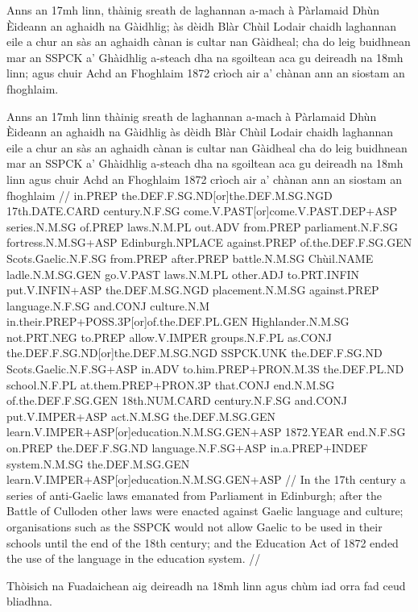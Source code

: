 \documentclass[a4paper,10pt]{article}
\begin{document}
\ex
\begingl
\glpre Anns an 17mh linn, thàinig sreath de laghannan a-mach à Pàrlamaid Dhùn Èideann an aghaidh na Gàidhlig; às dèidh Blàr Chùil Lodair chaidh laghannan eile a chur an sàs an aghaidh cànan is cultar nan Gàidheal; cha do leig buidhnean mar an SSPCK a' Ghàidhlig a-steach dha na sgoiltean aca gu deireadh na 18mh linn; agus chuir Achd an Fhoghlaim 1872 crìoch air a' chànan ann an siostam an fhoghlaim. 

\vspace{4mm}
\gla Anns an 17mh linn thàinig sreath de laghannan a-mach à Pàrlamaid Dhùn Èideann {an aghaidh} na Gàidhlig às dèidh Blàr Chùil Lodair chaidh laghannan eile a chur an sàs {an aghaidh} cànan is cultar nan Gàidheal cha do leig buidhnean mar an SSPCK a' Ghàidhlig a-steach dha na sgoiltean aca gu deireadh na 18mh linn agus chuir Achd an Fhoghlaim 1872 crìoch air a' chànan {ann an} siostam an fhoghlaim  //
\glb in.PREP the.DEF.F.SG.ND[or]the.DEF.M.SG.NGD 17th.DATE.CARD century.N.F.SG come.V.PAST[or]come.V.PAST.DEP+ASP series.N.M.SG of.PREP laws.N.M.PL out.ADV from.PREP parliament.N.F.SG fortress.N.M.SG+ASP Edinburgh.NPLACE against.PREP of.the.DEF.F.SG.GEN Scots.Gaelic.N.F.SG from.PREP after.PREP battle.N.M.SG Chùil.NAME ladle.N.M.SG.GEN go.V.PAST laws.N.M.PL other.ADJ to.PRT.INFIN put.V.INFIN+ASP the.DEF.M.SG.NGD placement.N.M.SG against.PREP language.N.F.SG and.CONJ culture.N.M in.their.PREP+POSS.3P[or]of.the.DEF.PL.GEN Highlander.N.M.SG not.PRT.NEG to.PREP allow.V.IMPER groups.N.F.PL as.CONJ the.DEF.F.SG.ND[or]the.DEF.M.SG.NGD SSPCK.UNK the.DEF.F.SG.ND Scots.Gaelic.N.F.SG+ASP in.ADV to.him.PREP+PRON.M.3S the.DEF.PL.ND school.N.F.PL at.them.PREP+PRON.3P that.CONJ end.N.M.SG of.the.DEF.F.SG.GEN 18th.NUM.CARD century.N.F.SG and.CONJ put.V.IMPER+ASP act.N.M.SG the.DEF.M.SG.GEN learn.V.IMPER+ASP[or]education.N.M.SG.GEN+ASP 1872.YEAR end.N.F.SG on.PREP the.DEF.F.SG.ND language.N.F.SG+ASP in.a.PREP+INDEF system.N.M.SG the.DEF.M.SG.GEN learn.V.IMPER+ASP[or]education.N.M.SG.GEN+ASP  //
\glft In the 17th century a series of anti-Gaelic laws emanated from Parliament in Edinburgh; after the Battle of Culloden other laws were enacted against Gaelic language and culture; organisations such as the SSPCK would not allow Gaelic to be used in their schools until the end of the 18th century; and the Education Act of 1872 ended the use of the language in the education system. //
\endgl
\xe

\ex
\begingl
\glpre Thòisich na Fuadaichean aig deireadh na 18mh linn agus chùm iad orra fad ceud bliadhna. 
\end{document}
